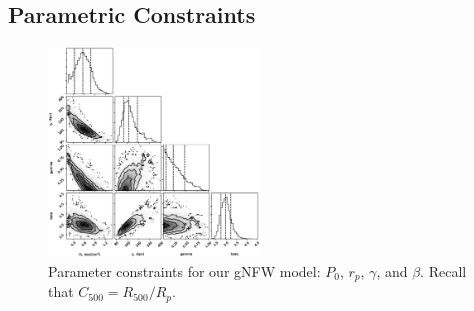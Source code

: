 \documentclass[twocolumn,traditabstract]{aa}
\begin{document}

\subsection{Parametric Constraints}
\label{sec:parametric}

\begin{figure}[!h]
  \centering
  \includegraphics[width=0.5\textwidth]{NIKA_ml_deproj_figs/Real_Joint_gNFW_Real_11011111_2500S_500B_100W_contour_p16cosmo.eps}
  \caption{Parameter constraints for our gNFW model: $P_0$, $r_p$, $\gamma$, and $\beta$. Recall that $C_{500} = R_{500} / R_p$.}
  \label{fig:joint_constraints}
\end{figure}
\end{document}
